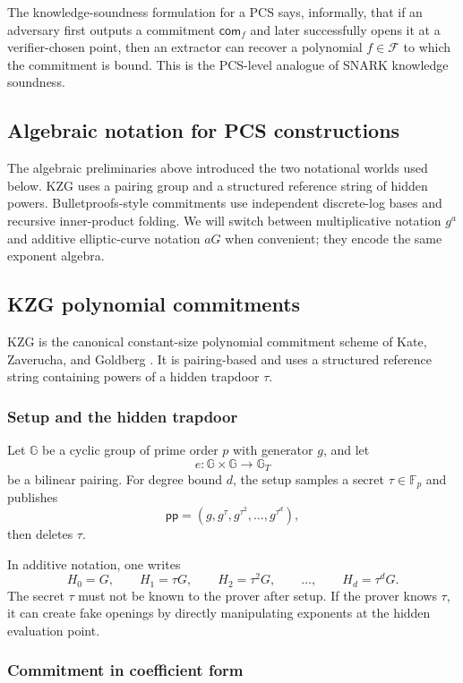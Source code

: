 \documentclass[11pt]{article}
\newcommand{\F}{\mathbb{F}}
\newcommand{\pp}{\mathsf{pp}}
\newcommand{\G}{\mathbb{G}}
\newcommand{\GT}{\mathbb{G}_T}
\begin{document}
The knowledge-soundness formulation for a PCS says, informally, that if an adversary first outputs a commitment $\mathsf{com}_f$ and later successfully opens it at a verifier-chosen point, then an extractor can recover a polynomial $f\in\mathcal{F}$ to which the commitment is bound. This is the PCS-level analogue of SNARK knowledge soundness.

\subsection{Algebraic notation for PCS constructions}

The algebraic preliminaries above introduced the two notational worlds used below. KZG uses a pairing group and a structured reference string of hidden powers. Bulletproofs-style commitments use independent discrete-log bases and recursive inner-product folding. We will switch between multiplicative notation $g^a$ and additive elliptic-curve notation $aG$ when convenient; they encode the same exponent algebra.

\subsection{KZG polynomial commitments}

KZG is the canonical constant-size polynomial commitment scheme of Kate, Zaverucha, and Goldberg \cite{KateZaveruchaGoldberg2010}. It is pairing-based and uses a structured reference string containing powers of a hidden trapdoor $\tau$.

\subsubsection{Setup and the hidden trapdoor}

Let $\G$ be a cyclic group of prime order $p$ with generator $g$, and let
\[
    e:\G\times\G\to\GT
\]
be a bilinear pairing. For degree bound $d$, the setup samples a secret $\tau\in\F_p$ and publishes
\[
    \pp=(g,g^\tau,g^{\tau^2},\dots,g^{\tau^d}),
\]
then deletes $\tau$.

In additive notation, one writes
\[
    H_0=G,
    \qquad
    H_1=\tau G,
    \qquad
    H_2=\tau^2G,
    \qquad
    \ldots,
    \qquad
    H_d=\tau^dG.
\]
The secret $\tau$ must not be known to the prover after setup. If the prover knows $\tau$, it can create fake openings by directly manipulating exponents at the hidden evaluation point.

\subsubsection{Commitment in coefficient form}
\end{document}
